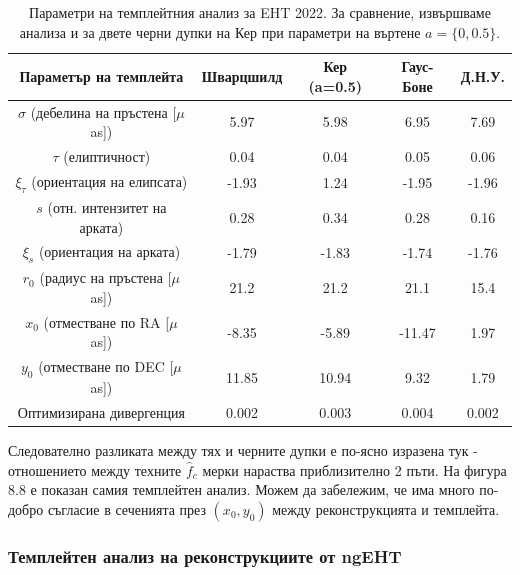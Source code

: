 \begin{table}[h!]
	\centering
	\begin{tabular}{c|c|c|c|c}
		\hline
		{Параметър на темплейта} & {Шварцшилд}&{Кер (a=0.5)}&{Гаус-Боне}&{Д.Н.У.}
		\\\hline\hline
		$\sigma$ {(\small дебелина на пръстена [$\mu$as])}& 5.97& 5.98& 6.95& 7.69
		\\
		$\tau$ {(\small елиптичност)} & 0.04& 0.04& 0.05& 0.06
		\\
		$\xi_\tau$ {(\small ориентация на елипсата)}& -1.93& 1.24& -1.95& -1.96
		\\
		$s$ {(\small отн. интензитет на арката)} & 0.28& 0.34& 0.28& 0.16
		\\
		$\xi_s$ {(\small ориентация на арката)}  & -1.79& -1.83& -1.74& -1.76
		\\\hline
		$r_0$ {(\small радиус на пръстена [$\mu$as])} & 21.2& 21.2& 21.1&15.4
		\\
		$x_0$ {(\small отместване по RA [$\mu$as])}  & -8.35& -5.89& -11.47& 1.97
		\\
		$y_0$ {(\small отместване по DEC [$\mu$as])} & 11.85& 10.94& 9.32& 1.79
		\\\hline\hline
		{Оптимизирана дивергенция} & 0.002& 0.003& 0.004& 0.002
		\\ \hline
	\end{tabular}
	\caption[Параметри на темплейтния анализ за EHT 2022.]{Параметри на темплейтния анализ за EHT 2022. За сравнение, извършваме анализа и за двете черни дупки на Кер при параметри на въртене $a =\{0,0.5\}$.}
	\label{table:VIDA_2022}
\end{table}

\newpage

Следователно разликата между тях и черните дупки е по-ясно изразена тук - отношението между техните $\hat{f}_c$ мерки нараства приблизително 2 пъти. 
На фигура 8.8 е показан самия темплейтен анализ. Можем да забележим, че има много по-добро съгласие в сеченията през $(x_0,y_0)$ между реконструкцията и темплейта.


\subsubsection{Темплейтен анализ на реконструкциите от ngEHT}

